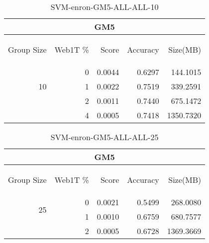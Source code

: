 \begin{center}
\begin{table}[htbp] 
 \begin{center}
\begin{tabular}{ | r | r | r | r | r |}
\hline
\multicolumn{5}{|c|}{GM5}\\
\hline
\begin{sideways}Group Size\end{sideways} & \begin{sideways}Web1T \%\end{sideways} & \begin{sideways}Score\end{sideways} & \begin{sideways}Accuracy\end{sideways} & \begin{sideways}Size(MB)\end{sideways}\\
\hline
\multirow{3}{*}{10}
 & 0 & 0.0044 & 0.6297 & 144.1015\\ \cline{2-5}
 & 1 & 0.0022 & 0.7519 & 339.2591\\ \cline{2-5}
 & 2 & 0.0011 & 0.7440 & 675.1472\\ \cline{2-5}
 & 4 & 0.0005 & 0.7418 & 1350.7320\\ \cline{2-5}
\hline
\end{tabular}
\caption{SVM-enron-GM5-ALL-ALL-10}
\label{table:SVM-enron-GM5-ALL-ALL-10}
\end{center}
 \end{table}
\end{center}

\begin{center}
\begin{table}[htbp] 
 \begin{center}
\begin{tabular}{ | r | r | r | r | r |}
\hline
\multicolumn{5}{|c|}{GM5}\\
\hline
\begin{sideways}Group Size\end{sideways} & \begin{sideways}Web1T \%\end{sideways} & \begin{sideways}Score\end{sideways} & \begin{sideways}Accuracy\end{sideways} & \begin{sideways}Size(MB)\end{sideways}\\
\hline
\multirow{2}{*}{25}
 & 0 & 0.0021 & 0.5499 & 268.0080\\ \cline{2-5}
 & 1 & 0.0010 & 0.6759 & 680.7577\\ \cline{2-5}
 & 2 & 0.0005 & 0.6728 & 1369.3669\\ \cline{2-5}
\hline
\end{tabular}
\caption{SVM-enron-GM5-ALL-ALL-25}
\label{table:SVM-enron-GM5-ALL-ALL-25}
\end{center}
 \end{table}
\end{center}

